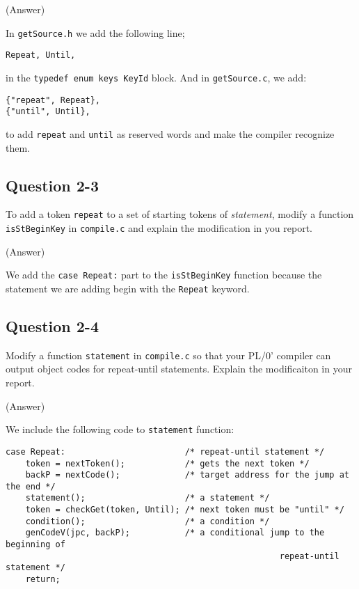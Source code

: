 \documentclass{article}
\begin{document}
\ifreport
(Answer)\\
\fi

In {\tt getSource.h} we add the following line;

\begin{verbatim}
Repeat, Until,
\end{verbatim}

in the {\tt typedef  enum  keys KeyId} block. And in {\tt getSource.c}, we add:

\begin{verbatim}
{"repeat", Repeat},
{"until", Until},
\end{verbatim}

to add {\tt repeat} and {\tt until} as reserved words and make the compiler
recognize them.


\subsection*{Question 2-3}
To add a token {\tt repeat} to a set of starting tokens of {\it statement},
modify a function {\tt isStBeginKey} in {\tt compile.c} and explain the modification in you report.

\ifreport
(Answer)\\
\fi

We add the {\tt case Repeat:} part to the {\tt isStBeginKey} function because
 the statement we are adding begin with the {\tt Repeat} keyword.


\subsection*{Question 2-4}
Modify a function {\tt statement} in {\tt compile.c}
so that your PL/0' compiler can output object codes for repeat-until statements.
Explain the modificaiton in your report.

\ifreport
(Answer)\\
\fi

We include the following code to {\tt statement} function:

\begin{verbatim}
case Repeat:                        /* repeat-until statement */
    token = nextToken();            /* gets the next token */
    backP = nextCode();             /* target address for the jump at the end */
    statement();                    /* a statement */
    token = checkGet(token, Until); /* next token must be "until" */
    condition();                    /* a condition */
    genCodeV(jpc, backP);           /* a conditional jump to the beginning of
                                                       repeat-until statement */
    return;
\end{verbatim}
\end{document}
